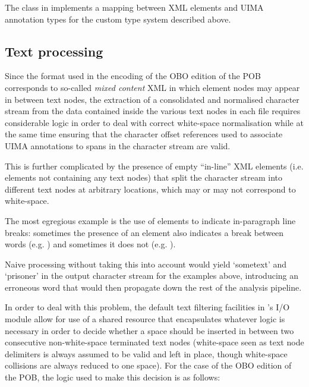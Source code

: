 The  class in  implements a mapping between XML elements and UIMA annotation types for the custom type system described above.

\subsection{Text processing}

Since the format used in the encoding of the OBO edition of the POB corresponds to so-called \emph{mixed content} XML in which element nodes may appear in between text nodes, the extraction of a consolidated and normalised character stream from the data contained inside the various text nodes in each file requires considerable logic in order to deal with correct white-space normalisation while at the same time ensuring that the character offset references used to associate UIMA annotations to spans in the character stream are valid.

This is further complicated by the presence of empty ``in-line'' XML elements (i.e. elements not containing any text nodes) that split the character stream into different text nodes at arbitrary locations, which may or may not correspond to white-space.

The most egregious example is the use of  elements to indicate in-paragraph line breaks: sometimes the presence of an  element also indicates a break between words (e.g. ) and sometimes it does not (e.g. ).

Naive processing without taking this into account would yield `sometext' and `prisoner' in the output character stream for the examples above, introducing an erroneous word that would then propagate down the rest of the analysis pipeline.

In order to deal with this problem, the default text filtering facilities in 's I/O module allow for use of a shared resource that encapsulates whatever logic is necessary in order to decide whether a space should be inserted in between two consecutive non-white-space terminated text nodes (white-space seen as text node delimiters is always assumed to be valid and left in place, though white-space collisions are always reduced to one space).
For the case of the OBO edition of the POB, the logic used to make this decision is as follows:


